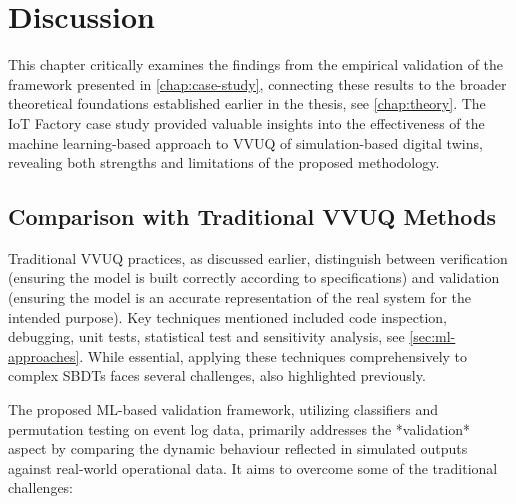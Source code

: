 \chapter{Discussion}
\label{chap:discussion}

This chapter critically examines the findings from the empirical validation of the framework presented in \autoref{chap:case-study}, connecting these results to the broader theoretical foundations established earlier in the thesis, see \autoref{chap:theory}. The IoT Factory case study provided valuable insights into the effectiveness of the machine learning-based approach to VVUQ of simulation-based digital twins, revealing both strengths and limitations of the proposed methodology.

\section{Comparison with Traditional VVUQ Methods}
\label{sec:comparison_manual}

Traditional VVUQ practices, as discussed earlier, distinguish between verification (ensuring the model is built correctly according to specifications) and validation (ensuring the model is an accurate representation of the real system for the intended purpose). Key techniques mentioned included code inspection, debugging, unit tests, statistical test and sensitivity analysis, see \autoref{sec:ml-approaches}. While essential, applying these techniques comprehensively to complex SBDTs faces several challenges, also highlighted previously.

The proposed ML-based validation framework, utilizing classifiers and permutation testing on event log data, primarily addresses the *validation* aspect by comparing the dynamic behaviour reflected in simulated outputs against real-world operational data. It aims to overcome some of the traditional challenges:

